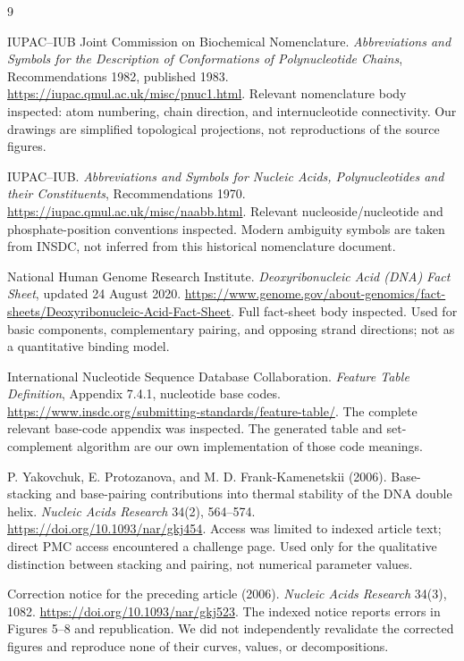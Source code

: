 \renewcommand{\bibname}{Sources and reading notes}
\begin{thebibliography}{9}
IUPAC--IUB Joint Commission on Biochemical Nomenclature.
\emph{Abbreviations and Symbols for the Description of Conformations of
Polynucleotide Chains}, Recommendations 1982, published 1983.
\url{https://iupac.qmul.ac.uk/misc/pnuc1.html}.
Relevant nomenclature body inspected: atom numbering, chain direction,
and internucleotide connectivity. Our drawings are simplified topological
projections, not reproductions of the source figures.

IUPAC--IUB. \emph{Abbreviations and Symbols for Nucleic Acids,
Polynucleotides and their Constituents}, Recommendations 1970.
\url{https://iupac.qmul.ac.uk/misc/naabb.html}.
Relevant nucleoside/nucleotide and phosphate-position conventions inspected.
Modern ambiguity symbols are taken from INSDC, not inferred from this
historical nomenclature document.

National Human Genome Research Institute.
\emph{Deoxyribonucleic Acid (DNA) Fact Sheet}, updated 24 August 2020.
\url{https://www.genome.gov/about-genomics/fact-sheets/Deoxyribonucleic-Acid-Fact-Sheet}.
Full fact-sheet body inspected. Used for basic components, complementary
pairing, and opposing strand directions; not as a quantitative binding model.

International Nucleotide Sequence Database Collaboration.
\emph{Feature Table Definition}, Appendix 7.4.1, nucleotide base codes.
\url{https://www.insdc.org/submitting-standards/feature-table/}.
The complete relevant base-code appendix was inspected. The generated table
and set-complement algorithm are our own implementation of those code meanings.

P. Yakovchuk, E. Protozanova, and M. D. Frank-Kamenetskii (2006).
Base-stacking and base-pairing contributions into thermal stability of the
DNA double helix. \emph{Nucleic Acids Research} 34(2), 564--574.
\url{https://doi.org/10.1093/nar/gkj454}.
Access was limited to indexed article text; direct PMC access encountered
a challenge page. Used only for the qualitative distinction between
stacking and pairing, not numerical parameter values.

Correction notice for the preceding article (2006).
\emph{Nucleic Acids Research} 34(3), 1082.
\url{https://doi.org/10.1093/nar/gkj523}.
The indexed notice reports errors in Figures 5--8 and republication.
We did not independently revalidate the corrected figures and reproduce
none of their curves, values, or decompositions.
\end{thebibliography}
